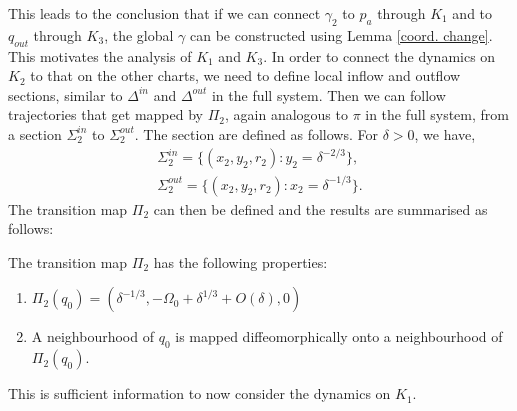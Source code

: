 This leads to the conclusion that if we can connect $\gamma_2$ to $p_a$  through $K_1$ and to $q_{out}$ through $K_3$, the global $\gamma$ can be constructed using Lemma \ref{coord. change}.
This motivates the analysis of $K_1$ and $K_3$.
In order to connect the dynamics on $K_2$ to that on the other charts, we need to define local inflow and outflow sections, similar to $\Delta^{in}$ and $\Delta^{out}$ in the full system.
Then we can follow trajectories that get mapped by $\Pi_2$, again analogous to $\pi$ in the full system, from a section $\Sigma^{in}_2$ to $\Sigma^{out}_2$.
The section are defined as follows. For $\delta>0$, we have,
\begin{align*}
\Sigma^{in}_2= \{ (x_2,y_2,r_2): y_2= \delta^{-2/3} \},\\
\Sigma^{out}_2 = \{ (x_2,y_2,r_2): x_2 = \delta^{-1/3} \}.
\end{align*}
The transition map $\Pi_2$ can then be defined and the results are summarised as follows:
\begin{prop}
The transition map $\Pi_2$ has the following properties:
\begin{enumerate}
\item $ \Pi_2(q_0)= (\delta^{-1/3}, - \Omega_0 + \delta^{1/3} + O(\delta), 0)$
\item A neighbourhood of $q_0$ is mapped diffeomorphically onto a neighbourhood of $\Pi_2(q_0)$.
\end{enumerate}
\end{prop}
 
This is sufficient information to now consider the dynamics on $K_1$.

